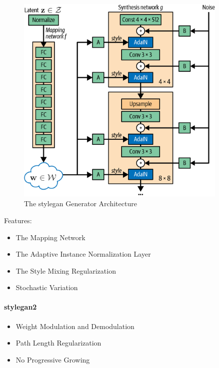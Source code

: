 \begin{figure}
	\begin{center}
		\includegraphics[width=0.9\textwidth]{figures/stylegan.png}
	\end{center}
	\caption{The \gls{stylegan} Generator Architecture}\label{fig:stylegan}
\end{figure}

Features:

\begin{itemize}
	\item The Mapping Network
	\item The Adaptive Instance Normalization Layer
	\item The Style Mixing Regularization
	\item Stochastic Variation
\end{itemize}

\paragraph{\gls{stylegan}2}

\begin{itemize}
	\item Weight Modulation and Demodulation
	\item Path Length Regularization
	\item No Progressive Growing
\end{itemize}

